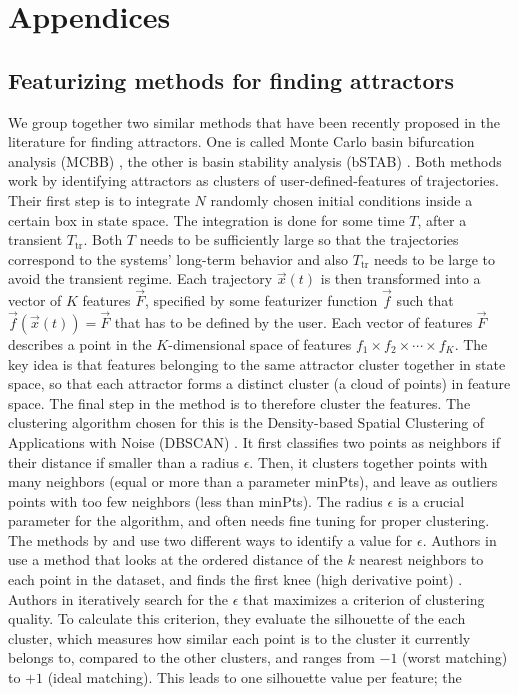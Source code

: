 \documentclass[%
 aip,
 amsmath,amssymb,
 reprint,%
]{revtex4-1}
\begin{document}

\section{Appendices}
\label{sec:methods}
\subsection{Featurizing methods for finding attractors}
\label{mat:featurizing_summary}
We group together two similar methods that have been recently proposed in the literature for finding attractors. One is called Monte Carlo basin bifurcation analysis (MCBB) \cite{Gelbrecht2020}, the other is basin stability analysis (bSTAB) \cite{Stender2021}. Both methods work by identifying attractors as clusters of user-defined-features of trajectories. Their first step is to integrate $N$ randomly chosen initial conditions inside a certain box in state space. The integration is done for some time $T$, after a transient $T_\mathrm{tr}$. Both $T$ needs to be sufficiently large so that the trajectories correspond to the systems' long-term behavior and also $T_\mathrm{tr}$ needs to be large to avoid the transient regime. Each trajectory $\vec{x}(t)$ is then transformed into a vector of $K$ features $\vec{F}$, specified by some featurizer function $\vec{f}$ such that $\vec{f}(\vec{x}(t)) = \vec{F}$ that has to be defined by the user. Each vector of features $\vec{F}$ describes a point in the $K$-dimensional space of features $f_1 \times f_2 \times \cdots \times f_K$. The key idea is that features belonging to the same attractor cluster together in state space, so that each attractor forms a distinct cluster (a cloud of points) in feature space. The final step in the method is to therefore cluster the features. The clustering algorithm chosen for this is the Density-based Spatial Clustering of Applications with Noise (DBSCAN) \cite{Ester1996}. It first classifies two points as neighbors if their distance if smaller than a radius $\epsilon$. Then, it clusters together points with many neighbors (equal or more than a parameter minPts), and leave as outliers points with too few neighbors (less than minPts). The radius $\epsilon$ is a crucial parameter for the algorithm, and often needs fine tuning for proper clustering. The methods by \cite{Gelbrecht2020} and \cite{Stender2021} use two different ways to identify a value for $\epsilon$. Authors in \cite{Gelbrecht2020} use a method that looks at the ordered distance of the $k$ nearest neighbors to each point in the dataset, and finds the first knee (high derivative point) \cite{Ester1996, Hahsler2019}. Authors in \cite{Stender2021} iteratively search for the $\epsilon$ that maximizes a criterion of clustering quality. To calculate this criterion, they evaluate the silhouette of the each cluster, which measures how similar each point is to the cluster it currently belongs to, compared to the other clusters, and ranges from $-1$ (worst matching) to $+1$ (ideal matching). This leads to one silhouette value per feature; the 
\end{document}
